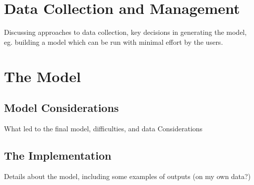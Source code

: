 \chapter{Data Collection and Management}
Discussing approaches to data collection, key decisions in generating the model, eg. building a model which can be run with minimal effort by the users.

\chapter{The Model}
\section{Model Considerations}
What led to the final model, difficulties, and data Considerations

\section{The Implementation}
Details about the model, including some examples of outputs (on my own data?)


